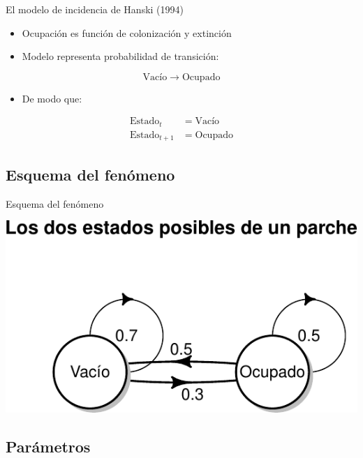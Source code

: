 \documentclass[
  11pt,
  ignorenonframetext,
]{beamer}
\providecommand{\tightlist}{%
  \setlength{\itemsep}{0pt}\setlength{\parskip}{0pt}}
\begin{document}
\begin{frame}{El modelo de incidencia de Hanski (1994)}
\begin{itemize}
\item
  Ocupación es función de colonización y extinción
\item
  Modelo representa probabilidad de transición:
\end{itemize}

\[\mathrm{Vacío} \rightarrow \mathrm{Ocupado}\]

\begin{itemize}
\tightlist
\item
  De modo que:
\end{itemize}

\begin{align}
\mathrm{Estado}_t &= \mathrm{Vacío} \\
\mathrm{Estado}_{t+1} &= \mathrm{Ocupado}
\end{align}
\end{frame}

\hypertarget{esquema-del-fenuxf3meno}{%
\subsection{Esquema del fenómeno}\label{esquema-del-fenuxf3meno}}

\begin{frame}{Esquema del fenómeno}
\begin{center}\includegraphics{Hanski_files/figure-beamer/unnamed-chunk-1-1} \end{center}
\end{frame}

\hypertarget{paruxe1metros}{%
\subsection{Parámetros}\label{paruxe1metros}}
\end{document}
